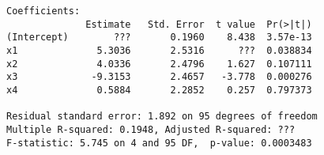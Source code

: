 \documentclass[11pt,addpoints]{exam}
\begin{document}
\begin{CJK*}{UTF8}{gbsn}
\begin{questions}
\begin{lstlisting}
Coefficients:
              Estimate   Std. Error  t value  Pr(>|t|)
(Intercept)        ???       0.1960    8.438  3.57e-13
x1              5.3036       2.5316      ???  0.038834
x2              4.0336       2.4796    1.627  0.107111
x3             -9.3153       2.4657   -3.778  0.000276
x4              0.5884       2.2852    0.257  0.797373

Residual standard error: 1.892 on 95 degrees of freedom
Multiple R-squared: 0.1948, Adjusted R-squared: ???
F-statistic: 5.745 on 4 and 95 DF,  p-value: 0.0003483
\end{lstlisting}

\end{questions}
\end{CJK*}
\end{document}
